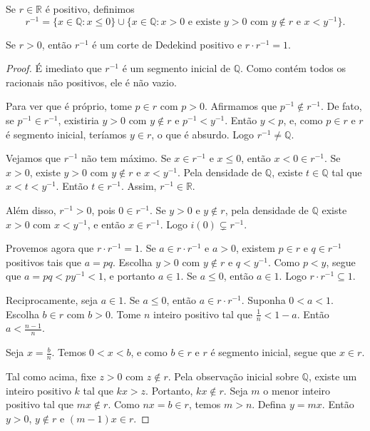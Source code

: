 \begin{definition}
    Se $r\in\mathbb R$ é positivo, definimos
    \[
        r^{-1}=\{x \in \mathbb Q: x\leq 0\}\cup\{x \in \mathbb Q: x>0 \text{ e existe } y>0 \text{ com } y\notin r \text{ e } x<y^{-1}\}.
    \]
\end{definition}

\begin{lemma}
    Se $r>0$, então $r^{-1}$ é um corte de Dedekind positivo e $r\cdot r^{-1}=1$.
\end{lemma}
\begin{proof}
    É imediato que $r^{-1}$ é um segmento inicial de $\mathbb Q$.
    Como contém todos os racionais não positivos, ele é não vazio.

    Para ver que é próprio, tome $p\in r$ com $p>0$.
    Afirmamos que $p^{-1}\notin r^{-1}$.
    De fato, se $p^{-1}\in r^{-1}$, existiria $y>0$ com $y\notin r$ e $p^{-1}<y^{-1}$.
    Então $y<p$, e, como $p\in r$ e $r$ é segmento inicial, teríamos $y\in r$, o que é absurdo.
    Logo $r^{-1}\neq \mathbb Q$.

    Vejamos que $r^{-1}$ não tem máximo.
    Se $x\in r^{-1}$ e $x\leq 0$, então $x<0\in r^{-1}$.
    Se $x>0$, existe $y>0$ com $y\notin r$ e $x<y^{-1}$.
    Pela densidade de $\mathbb Q$, existe $t\in\mathbb Q$ tal que $x<t<y^{-1}$.
    Então $t\in r^{-1}$.
    Assim, $r^{-1}\in\mathbb R$.

    Além disso, $r^{-1}>0$, pois $0\in r^{-1}$.
    Se $y>0$ e $y\notin r$, pela densidade de $\mathbb Q$ existe $x>0$ com $x<y^{-1}$, e então $x\in r^{-1}$.
    Logo $i(0)\subsetneq r^{-1}$.

    Provemos agora que $r\cdot r^{-1}=1$.
    Se $a\in r\cdot r^{-1}$ e $a>0$, existem $p\in r$ e $q\in r^{-1}$ positivos tais que $a=pq$.
    Escolha $y>0$ com $y\notin r$ e $q<y^{-1}$.
    Como $p<y$, segue que $a=pq<py^{-1}<1$, e portanto $a\in 1$.
    Se $a\leq 0$, então $a\in 1$.
    Logo $r\cdot r^{-1}\subseteq 1$.

    Reciprocamente, seja $a\in 1$.
    Se $a\leq 0$, então $a\in r\cdot r^{-1}$.
    Suponha $0<a<1$.
    Escolha $b\in r$ com $b>0$.
    Tome $n$ inteiro positivo tal que $\frac{1}{n}<1-a$.
    Então $a<\frac{n-1}{n}$.

    Seja $x=\frac{b}{n}$.
    Temos $0<x<b$, e como $b\in r$ e $r$ é segmento inicial, segue que $x\in r$.

    Tal como acima, fixe $z>0$ com $z\notin r$.
    Pela observação inicial sobre $\mathbb Q$, existe um inteiro positivo $k$ tal que $kx>z$.
    Portanto, $kx\notin r$.
    Seja $m$ o menor inteiro positivo tal que $mx\notin r$.
    Como $nx=b\in r$, temos $m>n$.
    Defina $y=mx$.
    Então $y>0$, $y\notin r$ e $(m-1)x\in r$.


\end{proof}
